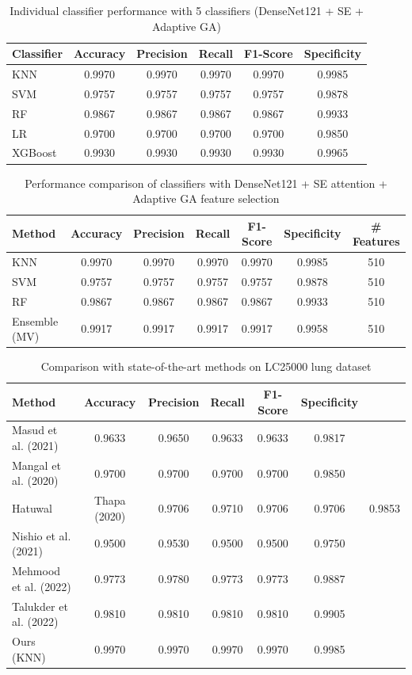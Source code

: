 \documentclass{article}
\begin{document}
\begin{table}[htbp]
\centering
\caption{Individual classifier performance with 5 classifiers (DenseNet121 + SE + Adaptive GA)}
\label{tab:table15_ind}
\begin{tabular}{lccccc}
\toprule
Classifier & Accuracy & Precision & Recall & F1-Score & Specificity \\
\midrule
KNN & 0.9970 & 0.9970 & 0.9970 & 0.9970 & 0.9985 \\
SVM & 0.9757 & 0.9757 & 0.9757 & 0.9757 & 0.9878 \\
RF & 0.9867 & 0.9867 & 0.9867 & 0.9867 & 0.9933 \\
LR & 0.9700 & 0.9700 & 0.9700 & 0.9700 & 0.9850 \\
XGBoost & 0.9930 & 0.9930 & 0.9930 & 0.9930 & 0.9965 \\
\bottomrule
\end{tabular}
\end{table}

\begin{table}[htbp]
\centering
\caption{Performance comparison of classifiers with DenseNet121 + SE attention + Adaptive GA feature selection}
\label{tab:table2}
\begin{tabular}{lcccccc}
\toprule
Method & Accuracy & Precision & Recall & F1-Score & Specificity & \# Features \\
\midrule
KNN & 0.9970 & 0.9970 & 0.9970 & 0.9970 & 0.9985 & 510 \\
SVM & 0.9757 & 0.9757 & 0.9757 & 0.9757 & 0.9878 & 510 \\
RF & 0.9867 & 0.9867 & 0.9867 & 0.9867 & 0.9933 & 510 \\
Ensemble (MV) & 0.9917 & 0.9917 & 0.9917 & 0.9917 & 0.9958 & 510 \\
\bottomrule
\end{tabular}
\end{table}

\begin{table}[htbp]
\centering
\caption{Comparison with state-of-the-art methods on LC25000 lung dataset}
\label{tab:table3}
\begin{tabular}{lccccc}
\toprule
Method & Accuracy & Precision & Recall & F1-Score & Specificity \\
\midrule
Masud et al. (2021) & 0.9633 & 0.9650 & 0.9633 & 0.9633 & 0.9817 \\
Mangal et al. (2020) & 0.9700 & 0.9700 & 0.9700 & 0.9700 & 0.9850 \\
Hatuwal & Thapa (2020) & 0.9706 & 0.9710 & 0.9706 & 0.9706 & 0.9853 \\
Nishio et al. (2021) & 0.9500 & 0.9530 & 0.9500 & 0.9500 & 0.9750 \\
Mehmood et al. (2022) & 0.9773 & 0.9780 & 0.9773 & 0.9773 & 0.9887 \\
Talukder et al. (2022) & 0.9810 & 0.9810 & 0.9810 & 0.9810 & 0.9905 \\
Ours (KNN) & 0.9970 & 0.9970 & 0.9970 & 0.9970 & 0.9985 \\
\bottomrule
\end{tabular}
\end{table}
\end{document}
